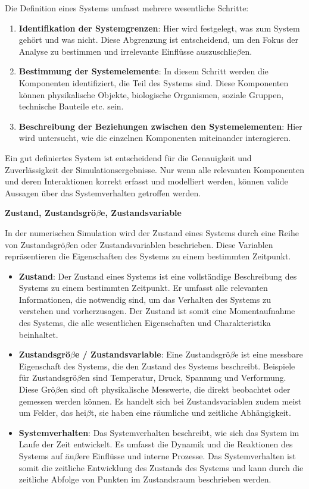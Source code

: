 Die Definition eines Systems umfasst mehrere wesentliche Schritte:

\begin{enumerate}
\item \textbf{Identifikation der Systemgrenzen}: Hier wird festgelegt, was zum System gehört und was nicht. Diese Abgrenzung ist entscheidend, um den Fokus der Analyse zu bestimmen und irrelevante Einflüsse auszuschlie$\beta$en.


\item \textbf{Bestimmung der Systemelemente}: In diesem Schritt werden die Komponenten identifiziert, die Teil des Systems sind. Diese Komponenten können physikalische Objekte, biologische Organismen, soziale Gruppen, technische Bauteile etc. sein.


\item \textbf{Beschreibung der Beziehungen zwischen den Systemelementen}: Hier wird untersucht, wie die einzelnen Komponenten miteinander interagieren.
\end{enumerate}

Ein gut definiertes System ist entscheidend für die Genauigkeit und Zuverlässigkeit der Simulationsergebnisse. Nur wenn alle relevanten Komponenten und deren Interaktionen korrekt erfasst und modelliert werden, können valide Aussagen über das Systemverhalten getroffen werden.

\textbf{Zustand, Zustandsgrö$\beta$e, Zustandsvariable}

In der numerischen Simulation wird der Zustand eines Systems durch eine Reihe von Zustandsgrö$\beta$en oder Zustandsvariablen beschrieben. Diese Variablen repräsentieren die Eigenschaften des Systems zu einem bestimmten Zeitpunkt.

\begin{itemize}
\item \textbf{Zustand}: Der Zustand eines Systems ist eine vollständige Beschreibung des Systems zu einem bestimmten Zeitpunkt. Er umfasst alle relevanten Informationen, die notwendig sind, um das Verhalten des Systems zu verstehen und vorherzusagen. Der Zustand ist somit eine Momentaufnahme des Systems, die alle wesentlichen Eigenschaften und Charakteristika beinhaltet.


\item \textbf{Zustandsgrö$\beta$e / Zustandsvariable}: Eine Zustandsgrö$\beta$e ist eine messbare Eigenschaft des Systems, die den Zustand des Systems beschreibt. Beispiele für Zustandsgrö$\beta$en sind Temperatur, Druck, Spannung und Verformung. Diese Grö$\beta$en sind oft physikalische Messwerte, die direkt beobachtet oder gemessen werden können. Es handelt sich bei Zustandsvariablen zudem meist um Felder, das hei$\beta$t, sie haben eine räumliche und zeitliche Abhängigkeit.


\item \textbf{Systemverhalten}: Das Systemverhalten beschreibt, wie sich das System im Laufe der Zeit entwickelt. Es umfasst die Dynamik und die Reaktionen des Systems auf äu$\beta$ere Einflüsse und interne Prozesse. Das Systemverhalten ist somit die zeitliche Entwicklung des Zustands des Systems und kann durch die zeitliche Abfolge von Punkten im Zustandsraum beschrieben werden.
\end{itemize}


